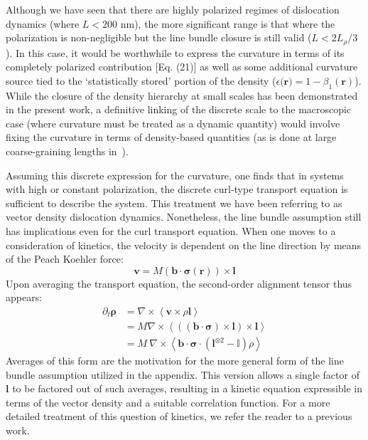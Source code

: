 Although we have seen that there are highly polarized regimes of dislocation dynamics (where \(L < 200\) nm), the more significant range is that where the polarization is non-negligible but the line bundle closure is still valid (\(L < 2L_{\rho}/3\)). In this case, it would be worthwhile to express the curvature in terms of its completely polarized contribution {[}Eq. (21){]} as well as some additional curvature source tied to the `statistically stored' portion of the density (\(\epsilon(\boldsymbol{r)} = 1 - \beta_{1}(\boldsymbol{r})\)). While the closure of the density hierarchy at small scales has been demonstrated in the present work, a definitive linking of the discrete scale to the macroscopic case (where curvature must be treated as a dynamic quantity) would involve fixing the curvature in terms of density-based quantities (as is done at large coarse-graining lengths in~\cite{zhangContinuumDislocationDynamics2025}).

Assuming this discrete expression for the curvature, one finds that in systems with high or constant polarization, the discrete curl-type transport equation is sufficient to describe the system. This treatment we have been referring to as vector density dislocation dynamics\cite{Anderson2022}. Nonetheless, the line bundle assumption still has implications even for the curl transport equation. When one moves to a consideration of kinetics, the velocity is dependent on the line direction by means of the Peach Koehler force:
\begin{equation}
\boldsymbol{v}=M\left( \boldsymbol{b} \cdot \boldsymbol{\sigma}\left( \boldsymbol{r} \right) \right)\times \boldsymbol{l}
\end{equation}
Upon averaging the transport equation, the second-order alignment tensor thus appears:
\begin{subequations}
\begin{align}
    \partial_{t}\boldsymbol{\rho}&=\nabla\times\left\langle \boldsymbol{v}\times\rho\boldsymbol{l} \right\rangle\\
    &= M\nabla \times \left\langle \left( \left( \boldsymbol{b} \cdot \boldsymbol{\sigma} \right)\times\boldsymbol{l} \right)\times \boldsymbol{l} \right\rangle\\
    &=M\ \nabla \times \left\langle \boldsymbol{b}\cdot \boldsymbol{\sigma} \cdot \left( \boldsymbol{l}^{\otimes2}-\mathbb{ I} \right)\rho \right\rangle
\end{align}
\end{subequations}
Averages of this form are the motivation for the more general form of the line bundle assumption utilized in the appendix. This version allows a single factor of \(\boldsymbol{l}\) to be factored out of such averages, resulting in a kinetic equation expressible in terms of the vector density and a suitable correlation function. For a more detailed treatment of this question of kinetics, we refer the reader to a previous work\cite{andersonDislocationCorrelationsContinuum2024}.

